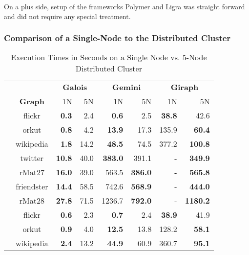On a plus side, setup of the frameworks Polymer and Ligra was straight forward and did not require any special treatment.











\subsubsection{Comparison of a Single-Node to the Distributed Cluster}
\begin{table}
	\caption{Execution Times in Seconds on a Single Node vs. 5-Node Distributed Cluster}
	\label{tbl:execTimeComparison}
	\renewcommand{\arraystretch}{1.2}
	\centering
	\begin{tabular}{ccr@{\tabskip 1 \tabcolsep}r
	r@{\tabskip 1 \tabcolsep}r
	r@{\tabskip 1 \tabcolsep}r}
		\toprule
		&&\multicolumn{2}{c}{\bf Galois}&\multicolumn{2}{c}{\bf Gemini}&\multicolumn{2}{c}{\bf Giraph}\\
		\cmidrule{3-4}\cmidrule{5-6}\cmidrule{7-8}
		&\bf Graph&1N&5N&1N&5N&1N&5N\\
		\midrule
		\multirow{7}{0.5ex}{\rotatebox{90}{\bf SSSP}}&flickr & \bf 0.3 & 2.4 & \bf 0.6 & 2.5 & \bf 38.8 & 42.6 \\
		& orkut & \bf 0.8 & 4.2 & \bf 13.9 & 17.3 & 135.9 & \bf 60.4 \\
		& wikipedia & \bf 1.8 & 14.2 & \bf 48.5 & 74.5 & 377.2 & \bf 100.8 \\
		& twitter & \bf 10.8 & 40.0 & \bf 383.0 & 391.1 & - & \bf 349.9 \\
		& rMat27 & \bf 16.0 & 39.0 & 563.5 & \bf 386.0 & - & \bf 565.8 \\
		& friendster & \bf 14.4 & 58.5 & 742.6 & \bf 568.9 & - & \bf 444.0 \\
		& rMat28 & \bf 27.8 & 71.5 & 1236.7 & \bf 792.0 & - & \bf 1180.2 \\
		\midrule
		\multirow{7}{0.5ex}{\rotatebox{90}{\bf BFS}}& flickr & \bf 0.6 & 2.3 & \bf 0.7 & 2.4 & \bf 38.9 & 41.9 \\
		& orkut & \bf 0.9 & 4.0 & \bf 12.5 & 13.8 & 128.2 & \bf 58.1 \\
		& wikipedia & \bf 2.4 & 13.2 & \bf 44.9 & 60.9 & 360.7 & \bf 95.1 \\

\end{tabular}
\end{table}
